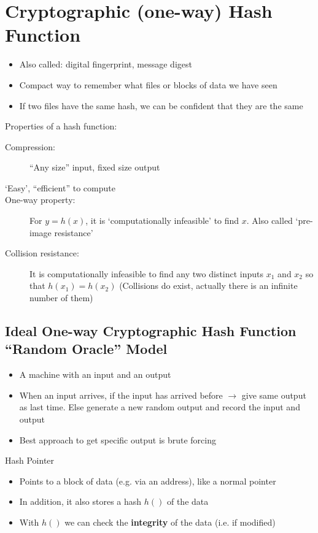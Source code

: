 \section{Cryptographic (one-way) Hash Function}
\begin{itemize}
	\item Also called: digital fingerprint, message digest
	\item Compact way to remember what files or blocks of data we have seen
	\item If two files have the same hash, we can be confident that they are the same
\end{itemize}
Properties of a hash function:
\begin{description}
	\item[Compression:] ``Any size'' input, fixed size output
	\item[`Easy', ``efficient'' to compute]
	\item[One-way property:] For $y=h(x)$, it is `computationally infeasible' to find $x$. Also called `pre-image resistance'
	\item[Collision resistance:] It is computationally infeasible to find any two distinct inputs $x_1$ and $x_2$ so that $h(x_1)=h(x_2)$ (Collisions do exist, actually there is an infinite number of them)
\end{description}

\subsection{Ideal One-way Cryptographic Hash Function ``Random Oracle'' Model}
\begin{itemize}
	\item A machine with an input and an output
	\item When an input arrives, if the input has arrived before $\rightarrow$ give same output as last time. Else generate a new random output and record the input and output
	\item Best approach to get specific output is brute forcing
\end{itemize}

\begin{note}{Hash Pointer}
	\begin{itemize}
		\item Points to a block of data (e.g. via an address), like a normal pointer
		\item In addition, it also stores a hash $h()$ of the data
		\item With $h()$ we can check the \textbf{integrity} of the data (i.e. if modified)
	\end{itemize}
\end{note}